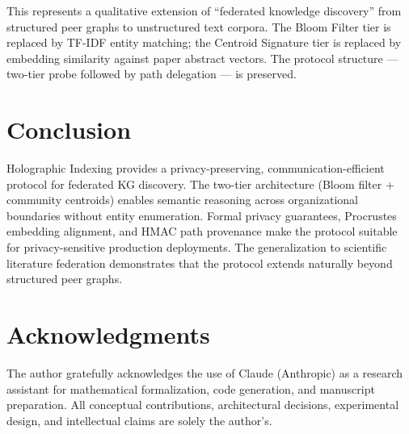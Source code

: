 \documentclass[10pt,twocolumn]{article}
\begin{document}
This represents a qualitative extension of ``federated knowledge discovery'' from
structured peer graphs to unstructured text corpora. The Bloom Filter tier is replaced
by TF-IDF entity matching; the Centroid Signature tier is replaced by embedding
similarity against paper abstract vectors. The protocol structure — two-tier probe
followed by path delegation — is preserved.

\section{Conclusion}
\label{sec:conclusion}

Holographic Indexing provides a privacy-preserving, communication-efficient protocol for
federated KG discovery. The two-tier architecture (Bloom filter + community centroids)
enables semantic reasoning across organizational boundaries without entity enumeration.
Formal privacy guarantees, Procrustes embedding alignment, and HMAC path provenance make
the protocol suitable for privacy-sensitive production deployments. The generalization to
scientific literature federation demonstrates that the protocol extends naturally beyond
structured peer graphs.

\section*{Acknowledgments}
The author gratefully acknowledges the use of Claude (Anthropic) as a research assistant
for mathematical formalization, code generation, and manuscript preparation. All
conceptual contributions, architectural decisions, experimental design, and intellectual
claims are solely the author's.
\end{document}
